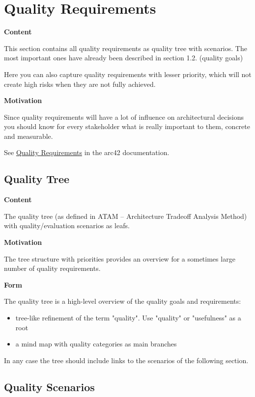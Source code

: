 \documentclass[
]{article}
\begin{document}
\hypertarget{section-quality-scenarios}{%
\section{Quality Requirements}\label{section-quality-scenarios}}

\textbf{Content}

This section contains all quality requirements as quality tree with
scenarios. The most important ones have already been described in
section 1.2. (quality goals)

Here you can also capture quality requirements with lesser priority,
which will not create high risks when they are not fully achieved.

\textbf{Motivation}

Since quality requirements will have a lot of influence on architectural
decisions you should know for every stakeholder what is really important
to them, concrete and measurable.

See \href{https://docs.arc42.org/section-10/}{Quality Requirements} in
the arc42 documentation.

\hypertarget{_quality_tree}{%
\subsection{Quality Tree}\label{_quality_tree}}

\textbf{Content}

The quality tree (as defined in ATAM -- Architecture Tradeoff Analysis
Method) with quality/evaluation scenarios as leafs.

\textbf{Motivation}

The tree structure with priorities provides an overview for a sometimes
large number of quality requirements.

\textbf{Form}

The quality tree is a high-level overview of the quality goals and
requirements:

\begin{itemize}
\item
  tree-like refinement of the term "quality". Use "quality" or
  "usefulness" as a root
\item
  a mind map with quality categories as main branches
\end{itemize}

In any case the tree should include links to the scenarios of the
following section.

\hypertarget{_quality_scenarios}{%
\subsection{Quality Scenarios}\label{_quality_scenarios}}
\end{document}
